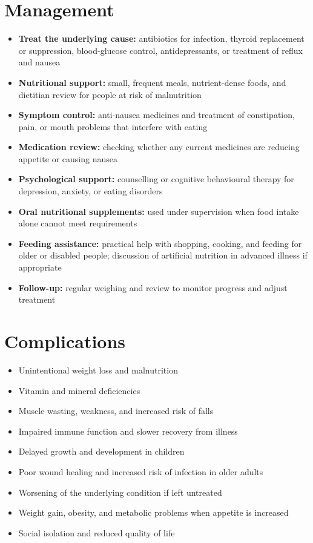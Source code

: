 \section*{Management}
\begin{itemize}
    \item \textbf{Treat the underlying cause:} antibiotics for infection, thyroid replacement or suppression, blood-glucose control, antidepressants, or treatment of reflux and nausea
    \item \textbf{Nutritional support:} small, frequent meals, nutrient-dense foods, and dietitian review for people at risk of malnutrition
    \item \textbf{Symptom control:} anti-nausea medicines and treatment of constipation, pain, or mouth problems that interfere with eating
    \item \textbf{Medication review:} checking whether any current medicines are reducing appetite or causing nausea
    \item \textbf{Psychological support:} counselling or cognitive behavioural therapy for depression, anxiety, or eating disorders
    \item \textbf{Oral nutritional supplements:} used under supervision when food intake alone cannot meet requirements
    \item \textbf{Feeding assistance:} practical help with shopping, cooking, and feeding for older or disabled people; discussion of artificial nutrition in advanced illness if appropriate
    \item \textbf{Follow-up:} regular weighing and review to monitor progress and adjust treatment
\end{itemize}

\section*{Complications}
\begin{itemize}
    \item Unintentional weight loss and malnutrition
    \item Vitamin and mineral deficiencies
    \item Muscle wasting, weakness, and increased risk of falls
    \item Impaired immune function and slower recovery from illness
    \item Delayed growth and development in children
    \item Poor wound healing and increased risk of infection in older adults
    \item Worsening of the underlying condition if left untreated
    \item Weight gain, obesity, and metabolic problems when appetite is increased
    \item Social isolation and reduced quality of life
\end{itemize}

